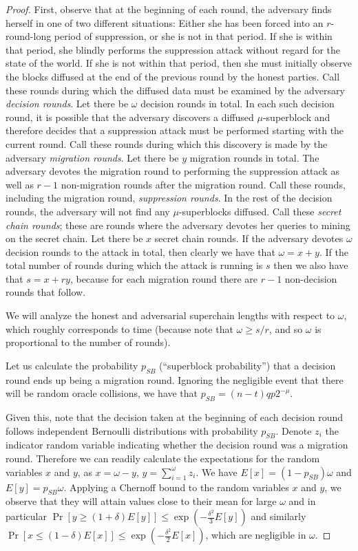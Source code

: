 \begin{proof}
First, observe that at the beginning of each round, the adversary finds herself
in one of two different situations: Either she has been forced into an
$r$-round-long period of suppression, or she is not in that period. If she is
within that period, she blindly performs the suppression attack without regard
for the state of the world. If she is not within that period, then she must
initially observe the blocks diffused at the end of the previous round by the
honest parties. Call these rounds during which the diffused data must be
examined by the adversary \textit{decision rounds}. Let there be $\omega$
decision rounds in total. In each such decision round, it is possible that the
adversary discovers a diffused $\mu$-superblock and therefore decides that a
suppression attack must be performed starting with the current round. Call these
rounds during which this discovery is made by the adversary \textit{migration
rounds}. Let there be $y$ migration rounds in total. The adversary devotes the
migration round to performing the suppression attack as well as $r - 1$
non-migration rounds after the migration round. Call these rounds, including the
migration round, \textit{suppression rounds}. In the rest of the decision
rounds, the adversary will not find any $\mu$-superblocks diffused. Call these
\textit{secret chain rounds}; these are rounds where the adversary devotes her
queries to mining on the secret chain. Let there be $x$ secret chain rounds. If
the adversary devotes $\omega$ decision rounds to the attack in total, then
clearly we have that $\omega = x + y$. If the total number of rounds during
which the attack is running is $s$ then we also have that $s = x + ry$, because
for each migration round there are $r - 1$ non-decision rounds that follow.

We will analyze the honest and adversarial superchain lengths with respect to
$\omega$, which roughly corresponds to time (because note that $\omega \geq
s/r$, and so $\omega$ is proportional to the number of rounds).

Let us calculate the probability $p_{SB}$ (``superblock probability'') that a
decision round ends up being a migration round. Ignoring the negligible event
that there will be random oracle collisions, we have that $p_{SB} = (n -
t)qp2^{-\mu}$.

Given this, note that the decision taken at the beginning of each decision round
follows independent Bernoulli distributions with probability $p_{SB}$. Denote
$z_i$ the indicator random variable indicating whether the decision round was
a migration round. Therefore we can readily calculate the expectations for the
random variables $x$ and $y$, as $x = \omega - y$, $y = \sum_{i=1}^\omega z_i$.
We have $E[x] = (1 - p_{SB})\omega$ and $E[y] = p_{SB}\omega$. Applying a
Chernoff bound to the random variables $x$ and $y$, we observe that they will
attain values close to their mean for large $\omega$ and in particular
$\Pr[y \geq (1 + \delta)E[y]] \leq \exp(-\frac{\delta^2}{3} E[y])$ and similarly
$\Pr[x \leq (1 - \delta)E[x]] \leq \exp(-\frac{\delta^2}{2} E[x])$, which are
negligible in $\omega$.


\end{proof}
